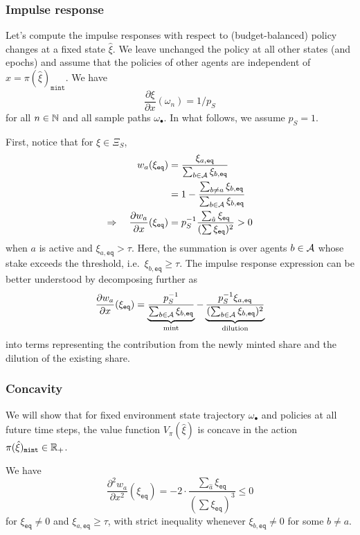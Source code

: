 \subsubsection{Impulse response}
Let's compute the impulse responses with respect to (budget-balanced) policy changes at a fixed state $\hat{\xi}$.
%
We leave unchanged the policy at all other states (and epochs) and assume that the policies of other agents are independent of $x=\pi(\hat{\xi})_\mathtt{mint}$.
%
We have
\[
  \frac{\partial\xi}{\partial x}(\omega_n) = 1/p_S
\]
for all $n\in\mathbb{N}$ and all sample paths $\omega_\bullet$.
%
In what follows, we assume $p_S=1$.

First, notice that for $\xi\in\Xi_S$,
\begin{align*}
  w_a(\xi_\mathtt{eq}) &= \frac{ \xi_{a,\mathtt{eq}} }{ \sum_{b\in\mathcal{A}}\xi_{b,\mathtt{eq}} } \\
  &= 1 - \frac{ \sum_{b\neq a}\xi_{b,\mathtt{eq}} }{ \sum_{b\in\mathcal{A}}\xi_{b,\mathtt{eq}} }  \\
  \Rightarrow\quad  \frac{\partial w_a}{\partial x}(\xi_\mathtt{eq}) &= p_S^{-1}\frac{\sum_{\hat{a}} \xi_\mathtt{eq}}{(\sum \xi_\mathtt{eq})^2} > 0 \\
\end{align*}
when $a$ is active and $\xi_{a,\mathtt{eq}}>\tau$.
%
Here, the summation is over agents $b\in\mathcal{A}$ whose stake exceeds the threshold, i.e.~$\xi_{b,\mathtt{eq}}\geq\tau$.
%
The impulse response expression can be better understood by decomposing further as
\[
  \frac{\partial w_a}{\partial x}(\xi_\mathtt{eq}) = 
    \underbrace{ \frac{ p_S^{-1} }{ \sum_{b\in\mathcal{A}}\xi_{b,\mathtt{eq}} } }_{\text{mint}} - 
    \underbrace{ \frac{ p_S^{-1}\xi_{a,\mathtt{eq}} }{ (\sum_{b\in\mathcal{A}}\xi_{b,\mathtt{eq}})^2 } }_{\text{dilution}}
\]
into terms representing the contribution from the newly minted share and the dilution of the existing share.


\subsubsection{Concavity}
We will show that for fixed environment state trajectory $\omega_\bullet$ and policies at all future time steps, the value function $V_\pi(\hat\xi)$ is concave in the action $\pi(\hat\xi)_\mathtt{mint}\in\mathbb{R}_+$.

We have
\[
  \frac {\partial^2 w_a} {\partial x^2} (\xi_\mathtt{eq}) = -2\cdot\frac {\sum_{\hat a}\xi_\mathtt{eq}} {(\sum \xi_\mathtt{eq})^3} \leq 0
\]
for $\xi_\mathtt{eq}\neq 0$ and $\xi_{a,\mathtt{eq}}\geq\tau$, with strict inequality whenever $\xi_{b,\mathtt{eq}}\neq 0$ for some $b\neq a$.

